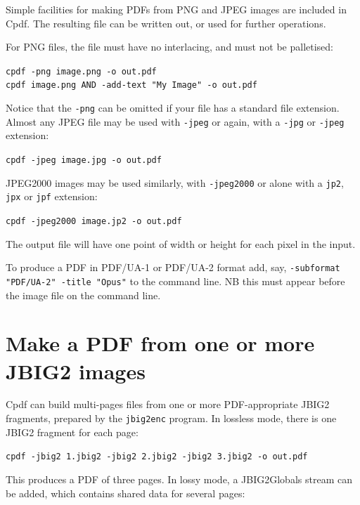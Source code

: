 \documentclass{book}
\begin{document}
Simple facilities for making PDFs from PNG and JPEG images are included in Cpdf. The resulting file can be written out, or used for further operations.

For PNG files, the file must have no interlacing, and must not be palletised:

\begin{framed}
 \noindent\small\verb?cpdf -png image.png -o out.pdf?\\
 \noindent\small\verb?cpdf image.png AND -add-text "My Image" -o out.pdf?
\end{framed}

\noindent Notice that the \texttt{-png} can be omitted if your file has a standard file extension. Almost any JPEG file may be used with \texttt{-jpeg} or again, with a \texttt{-jpg} or \texttt{-jpeg} extension:

\begin{framed}
 \noindent\small\verb?cpdf -jpeg image.jpg -o out.pdf?
\end{framed}

\noindent JPEG2000 images may be used similarly, with \texttt{-jpeg2000} or alone with a \texttt{jp2}, \texttt{jpx} or \texttt{jpf} extension:

\begin{framed}
 \noindent\small\verb?cpdf -jpeg2000 image.jp2 -o out.pdf?
\end{framed}

\noindent The output file will have one point of width or height for each pixel in the input.

To produce a PDF in PDF/UA-1 or PDF/UA-2 format add, say, \texttt{-subformat "PDF/UA-2" -title "Opus"} to the command line. NB this must appear before the image file on the command line.

\section{Make a PDF from one or more JBIG2 images}

Cpdf can build multi-pages files from one or more PDF-appropriate JBIG2 fragments, prepared by the \texttt{jbig2enc} program. In lossless mode, there is one JBIG2 fragment for each page:

\begin{framed}
 \noindent\small\verb?cpdf -jbig2 1.jbig2 -jbig2 2.jbig2 -jbig2 3.jbig2 -o out.pdf?
\end{framed}

\noindent This produces a PDF of three pages. In lossy mode, a JBIG2Globals stream can be added, which contains shared data for several pages:
\end{document}
